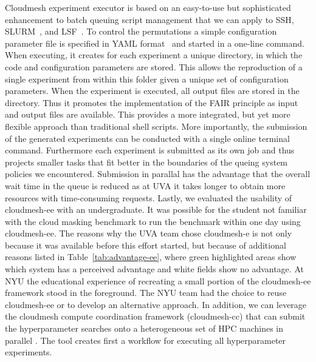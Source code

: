 \documentclass[sigplan,screen]{acmart}
\begin{document}
Cloudmesh experiment executor is based on an easy-to-use but sophisticated enhancement to batch queuing script management that we can apply to SSH, SLURM~\cite{www-slurm}, and LSF~\cite{www-lsf}. To control the permutations a simple configuration parameter file is specified in YAML format~\cite{github-cloudmesh-ee} and started in a one-line command. 
When executing, it creates for each experiment a unique directory, in which the code and configuration parameters are stored. This allows the reproduction of a single experiment from within this folder given a unique set of configuration parameters. When the experiment is executed, all output files are stored in the directory. Thus it promotes the implementation of the FAIR principle as input and output files are available.
This provides a more integrated, but yet more flexible approach than traditional shell scripts. More importantly, the submission of the generated experiments can be conducted with a single online terminal command. 
Furthermore each experiment is submitted as its own job and thus projects smaller tasks that fit better in the boundaries of the queing system policies we encountered. Submission in parallal has the advantage that the overall wait time in the queue is reduced as at UVA it takes longer to obtain more resources with time-consuming requests. Lastly, we evaluated the usability of cloudmesh-ee with an undergraduate. It was possible for the student not familiar with the cloud masking benchmark to run the benchmark within one day \cite{las-2023-escience-cloudmask} using cloudmesh-ee.
The reasons why the UVA team chose cloudmesh-e is not only because it was available before this effort started, but because of additional reasons listed in Table~\ref{tab:advantage-ee}, where green highlighted areas show which system has a perceived advantage and white fields show no advantage. At NYU the educational experience of recreating a small portion of the cloudmesh-ee framework stood in the foreground. The NYU team had the choice to reuse cloudmesh-ee or to develop an alternative approach.
In addition, we can leverage the cloudmesh compute coordination framework (cloudmesh-cc) that can submit the hyperparameter searches onto a heterogeneous set of HPC machines in parallel \cite{las-2023-ai-workflow,github-cloudmesh-cc,las22-cloudmesh-cc-reu}. The tool creates first a workflow for executing all hyperparameter experiments. 


\newcommand{\OK}{\cellcolor{green!10}}
\newcommand{\GR}{\cellcolor{gray!10}}
\end{document}
